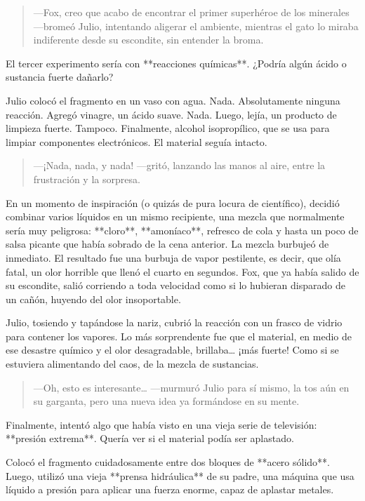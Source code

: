 \documentclass[a4paper,12pt]{book}
\begin{document}
\begin{quote}
    —Fox, creo que acabo de encontrar el primer superhéroe de los minerales —bromeó Julio, intentando aligerar el ambiente, mientras el gato lo miraba indiferente desde su escondite, sin entender la broma.
\end{quote}

El tercer experimento sería con **reacciones químicas**. ¿Podría algún ácido o sustancia fuerte dañarlo?

Julio colocó el fragmento en un vaso con agua. Nada. Absolutamente ninguna reacción. Agregó vinagre, un ácido suave. Nada. Luego, lejía, un producto de limpieza fuerte. Tampoco. Finalmente, alcohol isopropílico, que se usa para limpiar componentes electrónicos. El material seguía intacto.

\begin{quote}
    —¡Nada, nada, y nada! —gritó, lanzando las manos al aire, entre la frustración y la sorpresa.
\end{quote}

En un momento de inspiración (o quizás de pura locura de científico), decidió combinar varios líquidos en un mismo recipiente, una mezcla que normalmente sería muy peligrosa: **cloro**, **amoníaco**, refresco de cola y hasta un poco de salsa picante que había sobrado de la cena anterior. La mezcla burbujeó de inmediato. El resultado fue una burbuja de vapor pestilente, es decir, que olía fatal, un olor horrible que llenó el cuarto en segundos. Fox, que ya había salido de su escondite, salió corriendo a toda velocidad como si lo hubieran disparado de un cañón, huyendo del olor insoportable.

Julio, tosiendo y tapándose la nariz, cubrió la reacción con un frasco de vidrio para contener los vapores. Lo más sorprendente fue que el material, en medio de ese desastre químico y el olor desagradable, brillaba… ¡más fuerte! Como si se estuviera alimentando del caos, de la mezcla de sustancias.

\begin{quote}
    —Oh, esto es interesante… —murmuró Julio para sí mismo, la tos aún en su garganta, pero una nueva idea ya formándose en su mente.
\end{quote}

Finalmente, intentó algo que había visto en una vieja serie de televisión: **presión extrema**. Quería ver si el material podía ser aplastado.

Colocó el fragmento cuidadosamente entre dos bloques de **acero sólido**. Luego, utilizó una vieja **prensa hidráulica** de su padre, una máquina que usa líquido a presión para aplicar una fuerza enorme, capaz de aplastar metales.
\end{document}
